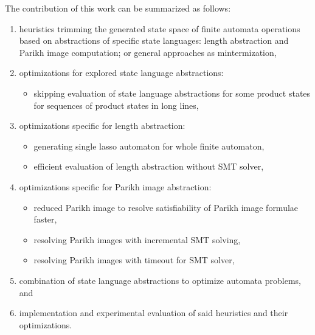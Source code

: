 The contribution of this work can be summarized as follows:
\begin{enumerate}
    \item heuristics trimming the generated state space of finite automata operations based on abstractions of specific state languages: length abstraction and Parikh image computation; or general approaches as mintermization,

    \item optimizations for explored state language abstractions:
    \begin{itemize}
        \item skipping evaluation of state language abstractions for some product states for sequences of product states in long lines,
    \end{itemize}

    \item optimizations specific for length abstraction:
    \begin{itemize}
        \item generating single lasso automaton for whole finite automaton,
        \item efficient evaluation of length abstraction without SMT solver,
    \end{itemize}

    \item optimizations specific for Parikh image abstraction:
    \begin{itemize}
        \item reduced Parikh image to resolve satisfiability of Parikh image formulae faster,
        \item resolving Parikh images with incremental SMT solving,
        \item resolving Parikh images with timeout for SMT solver,
    \end{itemize}

    \item combination of state language abstractions to optimize automata problems, and

    \item implementation and experimental evaluation of said heuristics and their optimizations.
\end{enumerate}


